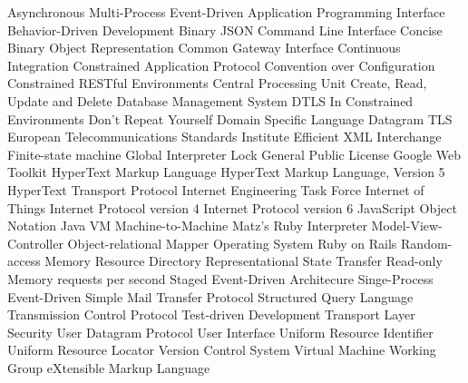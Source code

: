 \begin{acronym}
	 {Asynchronous Multi-Process Event-Driven}
	   {Application Programming Interface}
	   {Behavior-Driven Development}
	  {Binary \acs{JSON}}
	   {Command Line Interface}
	  {Concise Binary Object Representation}
	   {Common Gateway Interface}
	    {Continuous Integration}
	  {Constrained Application Protocol}
	   {Convention over Configuration}
	  {Constrained RESTful Environments}
	   {Central Processing Unit}
	  {Create, Read, Update and Delete}
	  {Database Management System}
	  {\acs{DTLS} In Constrained Environments}
	   {Don't Repeat Yourself}
	   {Domain Specific Language}
	  {Datagram \acl{TLS}}
	  {European Telecommunications Standards Institute}
	   {Efficient \acs{XML} Interchange}
		 {Finite-state machine}
		 {Global Interpreter Lock}
	   {General Public License}
	   {Google Web Toolkit}
	  {HyperText Markup Language}
	 {HyperText Markup Language, Version 5}
	  {HyperText Transport Protocol}
	  {Internet Engineering Task Force}
	   {Internet of Things}
	  {Internet Protocol version 4}
	  {Internet Protocol version 6}
	  {JavaScript Object Notation}
	   {Java \acl{VM}}
		 {Machine-to-Machine}
		 {Matz's Ruby Interpreter}
	   {Model-View-Controller}
	   {Object-relational Mapper}
		 {Operating System}
	 {Ruby on Rails}
	   {Random-access Memory}
	    {Resource Directory}
	  {Representational State Transfer}
	   {Read-only Memory}
		 {requests per second}
	  {Staged Event-Driven Architecure}
	  {Singe-Process Event-Driven}
	  {Simple Mail Transfer Protocol}
	   {Structured Query Language}
	   {Transmission Control Protocol}
	   {Test-driven Development}
	   {Transport Layer Security}
	   {User Datagram Protocol}
		 {User Interface}
		 {Uniform Resource Identifier}
	   {Uniform Resource Locator}
		 {Version Control System}
	    {Virtual Machine}
	    {Working Group}
		 {eXtensible Markup Language}
\end{acronym}
